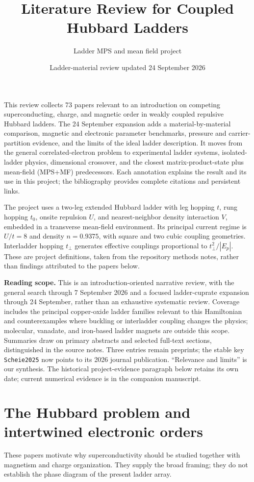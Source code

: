 \documentclass[11pt]{article}
\title{Literature Review for Coupled Hubbard Ladders}
\author{Ladder MPS and mean field project}
\date{Ladder-material review updated 24 September 2026}
\begin{document}
\maketitle

This review collects 73 papers relevant to an introduction on competing superconducting, charge, and magnetic order in weakly coupled repulsive Hubbard ladders. The 24 September expansion adds a material-by-material comparison, magnetic and electronic parameter benchmarks, pressure and carrier-partition evidence, and the limits of the ideal ladder description. It moves from the general correlated-electron problem to experimental ladder systems, isolated-ladder physics, dimensional crossover, and the closest matrix-product-state plus mean-field (MPS+MF) predecessors. Each annotation explains the result and its use in this project; the bibliography provides complete citations and persistent links.

The project uses a two-leg extended Hubbard ladder with leg hopping $t$, rung hopping $t_0$, onsite repulsion $U$, and nearest-neighbor density interaction $V$, embedded in a transverse mean-field environment. Its principal current regime is $U/t=8$ and density $n=0.9375$, with square and two cubic coupling geometries. Interladder hopping $t_\perp$ generates effective couplings proportional to $t_\perp^2/|E_p|$. These are project definitions, taken from the repository methods notes, rather than findings attributed to the papers below.

\textbf{Reading scope.} This is an introduction-oriented narrative review, with the general search through 7 September 2026 and a focused ladder-cuprate expansion through 24 September, rather than an exhaustive systematic review. Coverage includes the principal copper-oxide ladder families relevant to this Hamiltonian and counterexamples where buckling or interladder coupling changes the physics; molecular, vanadate, and iron-based ladder magnets are outside this scope. Summaries draw on primary abstracts and selected full-text sections, distinguished in the source notes. Three entries remain preprints; the stable key \texttt{Scheie2025} now points to its 2026 journal publication. ``Relevance and limits'' is our synthesis. The historical project-evidence paragraph below retains its own date; current numerical evidence is in the companion manuscript.

\tableofcontents

\section{The Hubbard problem and intertwined electronic orders}
These papers motivate why superconductivity should be studied together with magnetism and charge organization. They supply the broad framing; they do not establish the phase diagram of the present ladder array.
\end{document}
